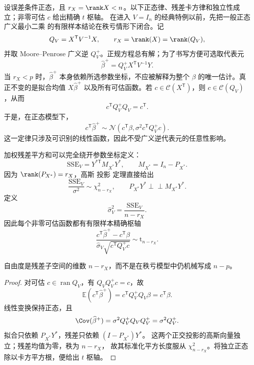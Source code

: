 \begin{theorem}
设误差条件正态，且 $r_X=\rank X<n$。以下正态律、残差卡方律和独立性成立；非零可估 $c$ 给出精确 $t$ 枢轴。
在进入 $V=I_n$ 的经典特例以前，先把一般正态 广义最小二乘 的有限样本结论在秩亏情形下闭合。记
\[
 Q_V=X^{\mathsf T}V^{-1}X,
 \qquad
 r_X=\rank(X)=\rank(Q_V),
\]
并取 Moore--Penrose 广义逆 $Q_V^+$。正规方程总有解；为了书写方便可选取代表元
\[
 \widehat\beta^+
 =Q_V^+X^{\mathsf T}V^{-1}Y.
\]
当 $r_X<p$ 时，$\widehat\beta^+$ 本身依赖所选参数坐标，不应被解释为整个 $\beta$ 的唯一估计。真正不变的是拟合均值 $X\widehat\beta^+$ 以及所有可估函数。若 $c\in\mathcal C(X^{\mathsf T})$，则 $c\in\mathcal C(Q_V)$，从而
\[
 c^{\mathsf T}Q_V^+Q_V=c^{\mathsf T}.
\]
于是，在正态模型下，
\begin{equation}\label{eq:math-stat-gls-estimable-normal-law}
 c^{\mathsf T}\widehat\beta^+
 \sim\mathcal N\!\left(
 c^{\mathsf T}\beta,
 \sigma^2c^{\mathsf T}Q_V^+c
 \right).
\end{equation}
这一定律只涉及可识别的线性函数，因此不受广义逆代表元的任意性影响。

加权残差平方和可以完全绕开参数坐标定义：
\[
 \mathrm{SSE}_V
 =Y^{*\mathsf T}M_{X^*}Y^*,
 \qquad
 M_{X^*}=I_n-P_{X^*}.
\]
因为 $\rank(P_{X^*})=r_X$，高斯 投影 定理直接给出
\begin{equation}\label{eq:math-stat-gls-residual-chi-square}
 \frac{\mathrm{SSE}_V}{\sigma^2}\sim\chi^2_{n-r_X},
 \qquad
 P_{X^*}Y^*\mathrel{\perp\!\!\!\perp}M_{X^*}Y^*.
\end{equation}
定义
\[
 \widehat\sigma_V^2=\frac{\mathrm{SSE}_V}{n-r_X}.
\]
因此每个非零可估函数都有有限样本精确枢轴
\begin{equation}\label{eq:math-stat-gls-estimable-t}
 \frac{c^{\mathsf T}\widehat\beta^+-c^{\mathsf T}\beta}
 {\widehat\sigma_V\sqrt{c^{\mathsf T}Q_V^+c}}
 \sim\mathrm t_{n-r_X}.
\end{equation}

自由度是残差子空间的维数 $n-r_X$，而不是在秩亏模型中仍机械写成 $n-p$。
\end{theorem}
\begin{proof}
对可估 $c\in\operatorname{ran}Q_V$，有 $Q_VQ_V^+c=c$，故
\[
 \mathbb E(c^{\mathsf T}\widehat\beta^+)=c^{\mathsf T}Q_V^+Q_V\beta=c^{\mathsf T}\beta.
\]
线性变换保持正态，且
\[
 \Cov(\widehat\beta^+)=\sigma^2Q_V^+Q_VQ_V^+=\sigma^2Q_V^+.
\]
拟合只依赖 $P_{X^*}Y^*$，残差只依赖 $(I-P_{X^*})Y^*$。
这两个正交投影的高斯向量独立；残差均值为零，秩为 $n-r_X$，
故其标准化平方长度服从 $\chi^2_{n-r_X}$。将独立正态除以卡方平方根，便给出 $t$ 枢轴。
\end{proof}


